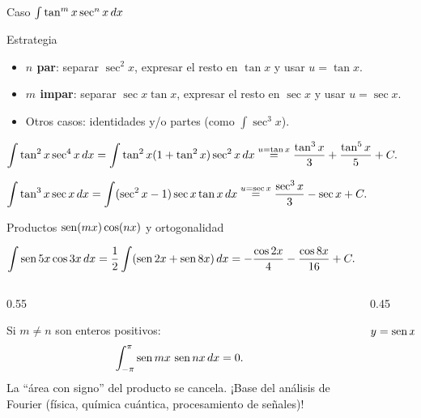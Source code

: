 \documentclass[10pt,aspectratio=169]{beamer}
\begin{document}
\begin{frame}{Caso $\int\tan^m x\sec^n x\,dx$}
  \begin{block}{Estrategia}
    \begin{itemize}
      \item \textbf{$n$ par}: separar $\sec^2x$, expresar el resto en $\tan x$ y usar $u=\tan x$.
      \item \textbf{$m$ impar}: separar $\sec x\tan x$, expresar el resto en $\sec x$ y usar $u=\sec x$.
      \item Otros casos: identidades y/o partes (como $\int\sec^3x$).
    \end{itemize}
  \end{block}
  \begin{ejemplo}[13: $n$ par]
    $\displaystyle\int\tan^2x\sec^4x\,dx=\int\tan^2x(1+\tan^2x)\sec^2x\,dx\overset{u=\tan x}{=}
    \frac{\tan^3x}{3}+\frac{\tan^5x}{5}+C.$
  \end{ejemplo}
  \begin{ejemplo}[14: $m$ impar]
    $\displaystyle\int\tan^3x\sec x\,dx=\int(\sec^2x-1)\sec x\tan x\,dx\overset{u=\sec x}{=}
    \frac{\sec^3x}{3}-\sec x+C.$
  \end{ejemplo}
\end{frame}

\begin{frame}{Productos $\operatorname{sen}(mx)\cos(nx)$ y ortogonalidad}
  \begin{ejemplo}[15]
    $\displaystyle\int\operatorname{sen}5x\cos3x\,dx=\frac12\int(\operatorname{sen}2x+\operatorname{sen}8x)\,dx=-\frac{\cos2x}{4}-\frac{\cos8x}{16}+C.$
  \end{ejemplo}
  \begin{columns}
    \begin{column}{0.55\textwidth}
      \begin{observacion}
        Si $m\neq n$ son enteros positivos:
        \[ \int_{-\pi}^{\pi}\operatorname{sen} mx\,\operatorname{sen} nx\,dx=0. \]
        La ``área con signo'' del producto se cancela. ¡Base del análisis de Fourier (física, química
        cuántica, procesamiento de señales)!
      \end{observacion}
    \end{column}
    \begin{column}{0.45\textwidth}

      \centering\small $y=\operatorname{sen} x\,\operatorname{sen} 2x$
    \end{column}
  \end{columns}
\end{frame}
\end{document}
